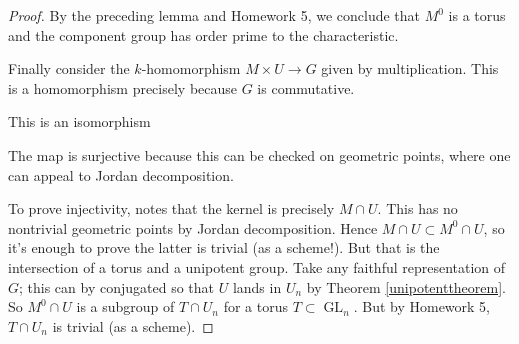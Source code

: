 \documentclass[10pt]{article}
\newcommand{\GL}{\operatorname{GL}}
\renewcommand{\(}{\left(}
\renewcommand{\)}{\right)}
\numberwithin{thm}{subsection}
\begin{document}
\begin{proof}
By the preceding lemma and Homework 5, we conclude that $M^0$ is a torus and the component group
has order prime to the characteristic.

Finally consider the $k$-homomorphism $M\times U\to G$
given by multiplication. This is a homomorphism
precisely because $G$ is commutative.
\begin{claim}This is an isomorphism
\end{claim}
The map is surjective because this can be checked on geometric points, where
one can appeal to Jordan decomposition.

To prove injectivity, notes that the kernel is precisely $M\cap U$.
This has no nontrivial geometric points
by Jordan decomposition.
Hence $M\cap U\subset M^0\cap U$, so it's enough to prove the latter
is trivial (as a scheme!). 
But that is the intersection of a torus and a unipotent group.
Take any faithful representation of $G$;
this can by conjugated so that $U$ lands in $U_n$
by Theorem \ref{unipotenttheorem}.
So  $M^0\cap U$ is a subgroup of $T\cap U_n$
for a torus $T\subset\GL_n$.
But by Homework 5, $T\cap U_n$ is trivial (as a scheme). 
\end{proof}
\end{document}
